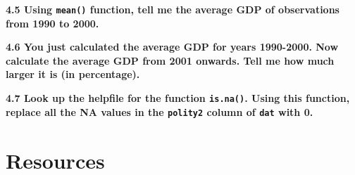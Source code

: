 \documentclass[]{book}
\newenvironment{Shaded}{\begin{snugshade}}{\end{snugshade}}
\newcommand{\CommentTok}[1]{\textcolor[rgb]{0.56,0.35,0.01}{\textit{#1}}}
\newcommand{\DataTypeTok}[1]{\textcolor[rgb]{0.13,0.29,0.53}{#1}}
\newcommand{\DecValTok}[1]{\textcolor[rgb]{0.00,0.00,0.81}{#1}}
\newcommand{\FloatTok}[1]{\textcolor[rgb]{0.00,0.00,0.81}{#1}}
\newcommand{\KeywordTok}[1]{\textcolor[rgb]{0.13,0.29,0.53}{\textbf{#1}}}
\newcommand{\NormalTok}[1]{#1}
\newcommand{\OperatorTok}[1]{\textcolor[rgb]{0.81,0.36,0.00}{\textbf{#1}}}
\newcommand{\StringTok}[1]{\textcolor[rgb]{0.31,0.60,0.02}{#1}}
\begin{document}
\textbf{4.5 Using \texttt{mean()} function, tell me the average GDP of observations from 1990 to 2000.}

\begin{Shaded}
\end{Shaded}

\textbf{4.6 You just calculated the average GDP for years 1990-2000. Now calculate the average GDP from 2001 onwards. Tell me how much larger it is (in percentage).}

\begin{Shaded}
\end{Shaded}

\textbf{4.7 Look up the helpfile for the function \texttt{is.na()}. Using this function, replace all the NA values in the \texttt{polity2} column of \texttt{dat} with 0.}

\begin{Shaded}
\end{Shaded}

\hypertarget{part-resources}{%
\part{Resources}\label{part-resources}}
\end{document}
